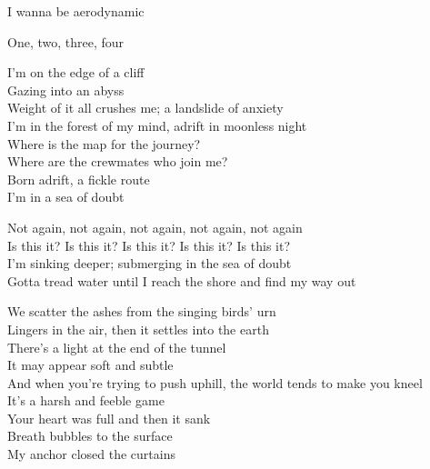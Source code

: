 
I wanna be aerodynamic \\




One, two, three, four \\


I'm on the edge of a cliff \\
Gazing into an abyss \\
Weight of it all crushes me; a landslide of anxiety \\
I'm in the forest of my mind, adrift in moonless night \\
Where is the map for the journey? \\
Where are the crewmates who join me? \\
Born adrift, a fickle route \\
I'm in a sea of doubt \\


Not again, not again, not again, not again, not again \\
Is this it? Is this it? Is this it? Is this it? Is this it? \\
I'm sinking deeper; submerging in the sea of doubt \\
Gotta tread water until I reach the shore and find my way out \\


We scatter the ashes from the singing birds' urn \\
Lingers in the air, then it settles into the earth \\
There's a light at the end of the tunnel \\
It may appear soft and subtle \\
And when you're trying to push uphill, the world tends to make you kneel \\
It's a harsh and feeble game \\
Your heart was full and then it sank \\
Breath bubbles to the surface \\
My anchor closed the curtains \\

